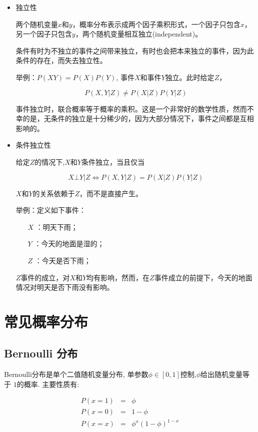 \begin{itemize}\itemsep0em
		\item 独立性

			两个随机变量$x$和$y$，概率分布表示成两个因子乘积形式，一个因子只包含$x$，另一个因子只包含$y$，两个随机变量相互独立(independent)。  

		条件有时为不独立的事件之间带来独立，有时也会把本来独立的事件，因为此条件的存在，而失去独立性。  

		举例：$P(XY)=P(X)P(Y)$, 事件$X$和事件$Y$独立。此时给定$Z$，

		$$
		P(X,Y|Z) \not = P(X|Z)P(Y|Z)
		$$

		事件独立时，联合概率等于概率的乘积。这是一个非常好的数学性质，然而不幸的是，无条件的独立是十分稀少的，因为大部分情况下，事件之间都是互相影响的。 

	\item 条件独立性

		给定$Z$的情况下,$X$和$Y$条件独立，当且仅当

		$$
		X\bot Y|Z \iff P(X,Y|Z) = P(X|Z)P(Y|Z)
		$$

		$X$和$Y$的关系依赖于$Z$，而不是直接产生。  


举例：定义如下事件：  

		\begin{itemize}
			\item[$X$]：明天下雨；  
			\item[$Y$]：今天的地面是湿的；  
			\item[$Z$]：今天是否下雨；  
		\end{itemize}

$Z$事件的成立，对$X$和$Y$均有影响，然而，在$Z$事件成立的前提下，今天的地面情况对明天是否下雨没有影响。 
\end{itemize}


\section{常见概率分布}

\subsection{Bernoulli 分布}

Bernoulli分布是单个二值随机变量分布, 单参数$\phi\in [0,1]$控制,$\phi$给出随机变量等于 $1$的概率. 主要性质有: 

\begin{eqnarray*}
	P(x=1) &=& \phi \\
	P(x=0) &=& 1-\phi  \\
	P(x=x) &=& \phi^x(1-\phi)^{1-x}
\end{eqnarray*}

